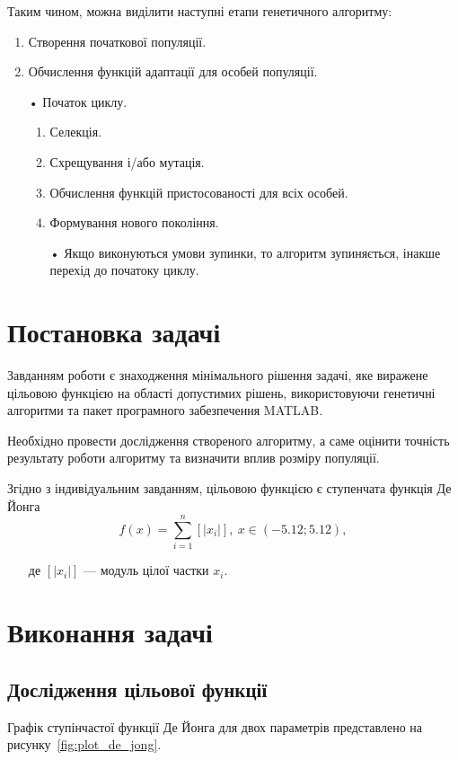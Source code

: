Таким чином, можна виділити наступні етапи генетичного алгоритму:
\begin{enumerate}
	\item Створення початкової популяції.
	\item Обчислення функцій адаптації для особей популяції.
	\item[• ] Початок циклу.
	\begin{enumerate}
		\item Селекція.
		\item Схрещування і/або мутація.
		\item Обчислення функцій пристосованості для всіх особей.
		\item Формування нового покоління.
		\item[• ] Якщо виконуються умови зупинки, то алгоритм зупиняється, інакше  перехід до початоку циклу.
	\end{enumerate}
\end{enumerate}

\section{Постановка задачі}
Завданням роботи є знаходження мінімального рішення задачі, яке виражене цільовою функцією на області допустимих рішень, використовуючи генетичні алгоритми та пакет програмного забезпечення MATLAB.

Необхідно провести дослідження створеного алгоритму, а саме оцінити точність результату роботи алгоритму та визначити вплив розміру популяції. 

Згідно з індивідуальним завданням, цільовою функцією є ступенчата функція Де Йонга
\[ f(x) = \sum_{i=1}^{n} [|x_i|],\:x\in(-5.12;5.12),\]
\begin{itemize}
	\item[де] $[|x_i|]$ --- модуль цілої частки $x_i$.
\end{itemize}

%
%
\section{Виконання задачі}
\subsection{Дослідження цільової функції}
Графік ступінчастої функції Де Йонга для двох параметрів представлено на рисунку~\ref{fig:plot_de_jong}.

